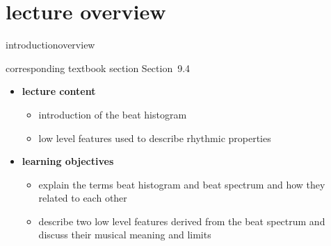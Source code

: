 


\subtitle{Module 9.4: Beat Histogram}


	

    \section[overview]{lecture overview}
        \begin{frame}{introduction}{overview}
            \begin{block}{corresponding textbook section}
                    Section~9.4
            \end{block}

            \begin{itemize}
                \item   \textbf{lecture content}
                    \begin{itemize}
                        \item   introduction of the beat histogram
                        \item   low level features used to describe rhythmic properties
                    \end{itemize}
                \bigskip
                \item<2->   \textbf{learning objectives}
                    \begin{itemize}
                        \item   explain the terms beat histogram and beat spectrum and how they related to each other
                        \item   describe two low level features derived from the beat spectrum and discuss their musical meaning and limits
                    \end{itemize}
            \end{itemize}
        \end{frame}

